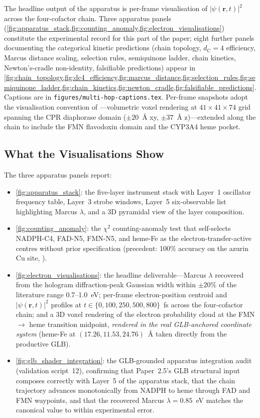 \documentclass[11pt,twocolumn,a4paper]{article}
\theoremstyle{definition}
\theoremstyle{remark}
\newcommand{\dC}{d_{\mathrm{C}}}
\begin{document}
The headline output of the apparatus is per-frame visualisation of
$|\psi(\mathbf{r}, t)|^2$ across the four-cofactor chain. Three apparatus
panels (\cref{fig:apparatus_stack,fig:counting_anomaly,fig:electron_visualisations})
constitute the experimental record for this part of the paper; eight
further panels documenting the categorical kinetic predictions
(chain topology, $\dC = 4$ efficiency, Marcus distance scaling,
selection rules, semiquinone ladder, chain kinetics, Newton's-cradle
non-identity, falsifiable predictions) appear in
\cref{fig:chain_topology,fig:dc4_efficiency,fig:marcus_distance,fig:selection_rules,fig:semiquinone_ladder,fig:chain_kinetics,fig:newton_cradle,fig:falsifiable_predictions}.
Captions are in \texttt{figures/multi-hop-captions.tex}.
Per-frame snapshots adopt the visualisation convention of
\citep{sachikonye2025_azurin}---volumetric voxel rendering at
$41 \times 41 \times 74$ grid spanning the CPR diaphorase domain
($\pm 20$~\AA{} xy, $\pm 37$~\AA{} z)---extended along the chain to
include the FMN flavodoxin domain and the CYP3A4 heme pocket.

\subsection{What the Visualisations Show}
\label{sec:visualisations_content}

The three apparatus panels report:
\begin{itemize}[leftmargin=*, nosep]
\item \cref{fig:apparatus_stack}: the five-layer instrument stack with
Layer~1 oscillator frequency table, Layer~3 strobe windows, Layer~5
six-observable list highlighting Marcus $\lambda$, and a 3D pyramidal
view of the layer composition.
\item \cref{fig:counting_anomaly}: the $\chi^2$ counting-anomaly test
that self-selects NADPH-C4, FAD-N5, FMN-N5, and heme-Fe as the
electron-transfer-active centres without prior specification (precedent:
100\% accuracy on the azurin Cu site,
\citep{sachikonye2025_atomicspec}).
\item \cref{fig:electron_visualisations}: the headline
deliverable---Marcus $\lambda$ recovered from the hologram
diffraction-peak Gaussian width within $\pm 20\%$ of the literature
range 0.7--1.0~eV; per-frame electron-position centroid and
$|\psi(\mathbf{r}, t)|^2$ profiles at $t \in \{0, 100, 250, 500, 800\}$~fs
across the four-cofactor chain; and a 3D voxel rendering of the
electron probability cloud at the FMN $\to$ heme transition midpoint,
\emph{rendered in the real GLB-anchored coordinate system} (heme-Fe at
$(17.26, 11.53, 24.76)$~\AA{} taken directly from the productive GLB).
\item \cref{fig:glb_shader_integration}: the GLB-grounded apparatus
integration audit (validation script~12), confirming that Paper~2.5's
GLB structural input composes correctly with Layer~5 of the apparatus
stack, that the chain trajectory advances monotonically from NADPH to
heme through FAD and FMN waypoints, and that the recovered Marcus
$\lambda = 0.85$~eV matches the canonical value to within experimental
error.
\end{itemize}
\end{document}
